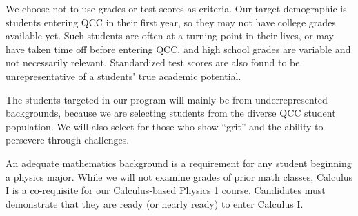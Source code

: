 \documentclass[12pt]{article}
\begin{document}
We choose not to use grades or test scores as criteria.  Our target demographic is students entering QCC in their first year, so they may not have college grades available yet.  Such students are often at a turning point in their lives, or may have taken time off before entering QCC, and high school grades are variable and not necessarily relevant.  Standardized test scores are also found to be unrepresentative of a students' true academic potential.

The students targeted in our program will mainly be from underrepresented backgrounds, because we are selecting students from the diverse QCC  student population.  We will also select for those who show ``grit'' and the ability to persevere through challenges.  

An adequate mathematics background is a requirement for any student beginning a physics major.  While we will not examine grades of prior math classes, Calculus I is a co-requisite for our Calculus-based Physics 1 course.  Candidates must demonstrate that they are ready (or nearly ready) to enter Calculus I.




\end{document}

